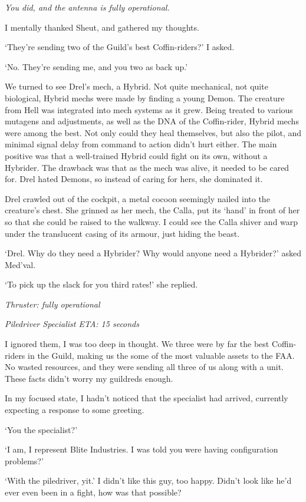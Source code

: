 {\it You did, and the antenna is fully operational.}

I mentally thanked Sheut, and gathered my thoughts.

`They're sending two of the Guild's best Coffin-riders?' I asked.

`No. They're sending me, and you two as back up.'

We turned to see Drel's mech, a Hybrid. Not quite mechanical, not quite biological, Hybrid mechs were made by finding a young Demon. The creature from Hell was integrated into mech systems as it grew. Being treated to various mutagens and adjustments, as well as the DNA of the Coffin-rider, Hybrid mechs were among the best. Not only could they heal themselves, but also the pilot, and minimal signal delay from command to action didn't hurt either. The main positive was that a well-trained Hybrid could fight on its own, without a Hybrider. The drawback was that as the mech was alive, it needed to be cared for. Drel hated Demons, so instead of caring for hers, she dominated it.

Drel crawled out of the cockpit, a metal cocoon seemingly nailed into the creature's chest. She grinned as her mech, the Calla, put its `hand' in front of her so that she could be raised to the walkway. I could see the Calla shiver and warp under the translucent casing of its armour, just hiding the beast.

`Drel. Why do they need a Hybrider? Why would anyone need a Hybrider?' asked Med'val.

`To pick up the slack for you third rates!' she replied.

{\it Thruster: fully operational}

{\it Piledriver Specialist ETA: 15 seconds}

I ignored them, I was too deep in thought. We three were by far the best Coffin-riders in the Guild, making us the some of the most valuable assets to the FAA. No wasted resources, and they were sending all three of us along with a unit. These facts didn't worry my guildreds enough.

In my focused state, I hadn't noticed that the specialist had arrived, currently expecting a response to some greeting.

`You the specialist?'

`I am, I represent Blite Industries. I was told you were having configuration problems?'

`With the piledriver, yit.' I didn't like this guy, too happy. Didn't look like he'd ever even been in a fight, how was that possible?

